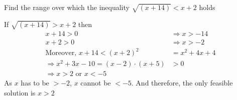 
%
%
%
%
% 
% 

\question Find the range over which the inequality $\sqrt{(x+14)} < x+2$ holds

\insertQR{}

\ifprintanswers
\fi 

\begin{solution}
  If $\sqrt{(x+14)} > x + 2$ then
	\begin{align}
	   x + 14 > 0 &\Rightarrow x > -14 \\
	   x + 2 > 0 &\Rightarrow x > -2 \\
	   \text{Moreover, } x + 14 < (x+2)^2 &= x^2+4x+4 \\
	   \Rightarrow x^2+3x-10 = (x-2)\cdot(x+5) &> 0 \\
	   \Rightarrow x > 2 \text{ or } x < -5 
	\end{align}
	As $x$ has to be $> -2$, $x$ cannot be $< -5$. And therefore, the only feasible solution is 
	$x > 2$
\end{solution}
